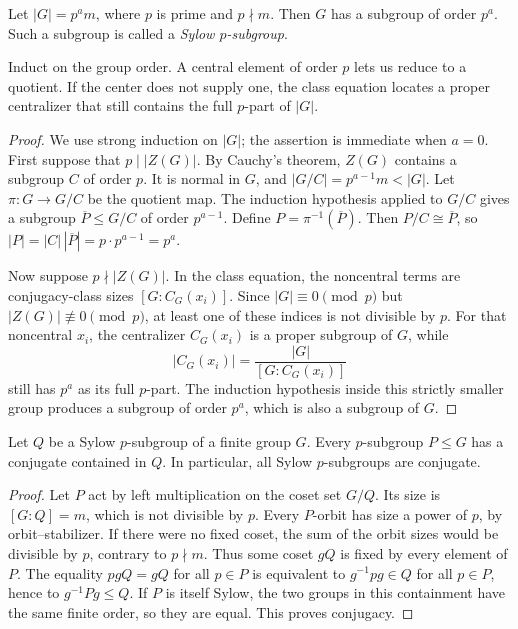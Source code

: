\begin{theorem}
Let \(|G|=p^am\), where \(p\) is prime and \(p\nmid m\).  Then \(G\) has a
subgroup of order \(p^a\).  Such a subgroup is called a \emph{Sylow
\(p\)-subgroup}.
\end{theorem}
\begin{proofidea}
Induct on the group order.  A central element of order \(p\) lets us reduce to
a quotient.  If the center does not supply one, the class equation locates a
proper centralizer that still contains the full \(p\)-part of \(|G|\).
\end{proofidea}
\begin{proof}
We use strong induction on \(|G|\); the assertion is immediate when \(a=0\).
First suppose that \(p\mid |Z(G)|\).  By Cauchy's theorem, \(Z(G)\) contains
a subgroup \(C\) of order \(p\).  It is normal in \(G\), and
\(|G/C|=p^{a-1}m<|G|\).  Let \(\pi:G\to G/C\) be the quotient map.  The
induction hypothesis applied to \(G/C\) gives a subgroup
\(\overline P\leq G/C\) of order \(p^{a-1}\).  Define
\(P=\pi^{-1}(\overline P)\).  Then \(P/C\cong\overline P\), so
\(|P|=|C|\,|\overline P|=p\cdot p^{a-1}=p^a\).

Now suppose \(p\nmid |Z(G)|\).  In the class equation, the noncentral terms
are conjugacy-class sizes \([G:C_G(x_i)]\).  Since \(|G|\equiv0\pmod p\) but
\(|Z(G)|\not\equiv0\pmod p\), at least one of these indices is not divisible
by \(p\).  For that noncentral \(x_i\), the centralizer \(C_G(x_i)\) is a
proper subgroup of \(G\), while
\[
 |C_G(x_i)|=\frac{|G|}{[G:C_G(x_i)]}
\]
still has \(p^a\) as its full \(p\)-part.  The induction hypothesis inside
this strictly smaller group produces a subgroup of order \(p^a\), which is
also a subgroup of \(G\).
\end{proof}

\begin{theorem}
Let \(Q\) be a Sylow \(p\)-subgroup of a finite group \(G\).  Every
\(p\)-subgroup \(P\leq G\) has a conjugate contained in \(Q\).  In particular,
all Sylow \(p\)-subgroups are conjugate.
\end{theorem}
\begin{proof}
Let \(P\) act by left multiplication on the coset set \(G/Q\).  Its size is
\([G:Q]=m\), which is not divisible by \(p\).  Every \(P\)-orbit has size a
power of \(p\), by orbit--stabilizer.  If there were no fixed coset, the sum
of the orbit sizes would be divisible by \(p\), contrary to \(p\nmid m\).
Thus some coset \(gQ\) is fixed by every element of \(P\).  The equality
\(pgQ=gQ\) for all \(p\in P\) is equivalent to
\(g^{-1}pg\in Q\) for all \(p\in P\), hence to \(g^{-1}Pg\leq Q\).
If \(P\) is itself Sylow, the two groups in this containment have the same
finite order, so they are equal.  This proves conjugacy.
\end{proof}

